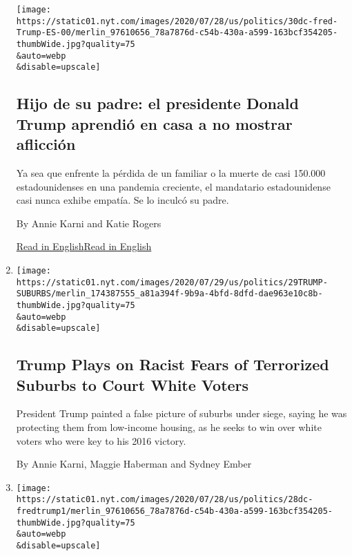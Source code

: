 \begin{enumerate}
  \texttt{[image: https://static01.nyt.com/images/2020/07/28/us/politics/30dc-fred-Trump-ES-00/merlin\_97610656\_78a7876d-c54b-430a-a599-163bcf354205-thumbWide.jpg?quality=75\\\&auto=webp\\\&disable=upscale]}

  \hypertarget{hijo-de-su-padre-el-presidente-donald-trump-aprendiuxf3-en-casa-a-no-mostrar-aflicciuxf3n}{%
  \subsection{Hijo de su padre: el presidente Donald Trump aprendió en
  casa a no mostrar
  aflicción}\label{hijo-de-su-padre-el-presidente-donald-trump-aprendiuxf3-en-casa-a-no-mostrar-aflicciuxf3n}}

  Ya sea que enfrente la pérdida de un familiar o la muerte de casi
  150.000 estadounidenses en una pandemia creciente, el mandatario
  estadounidense casi nunca exhibe empatía. Se lo inculcó su padre.

  By Annie Karni and Katie Rogers

  \href{https://www.nytimes.com/2020/07/28/us/politics/donald-fred-trump.html}{Read
  in
  English}\href{https://www.nytimes.com/2020/07/28/us/politics/donald-fred-trump.html}{Read
  in English}
\item
  \href{/2020/07/29/us/politics/trump-suburbs-housing-white-voters.html}{}

  \texttt{[image: https://static01.nyt.com/images/2020/07/29/us/politics/29TRUMP-SUBURBS/merlin\_174387555\_a81a394f-9b9a-4bfd-8dfd-dae963e10c8b-thumbWide.jpg?quality=75\\\&auto=webp\\\&disable=upscale]}

  \hypertarget{trump-plays-on-racist-fears-of-terrorized-suburbs-to-court-white-voters}{%
  \subsection{Trump Plays on Racist Fears of Terrorized Suburbs to Court
  White
  Voters}\label{trump-plays-on-racist-fears-of-terrorized-suburbs-to-court-white-voters}}

  President Trump painted a false picture of suburbs under siege, saying
  he was protecting them from low-income housing, as he seeks to win
  over white voters who were key to his 2016 victory.

  By Annie Karni, Maggie Haberman and Sydney Ember
\item
  \href{/2020/07/28/us/politics/donald-fred-trump.html}{}

  \texttt{[image: https://static01.nyt.com/images/2020/07/28/us/politics/28dc-fredtrump1/merlin\_97610656\_78a7876d-c54b-430a-a599-163bcf354205-thumbWide.jpg?quality=75\\\&auto=webp\\\&disable=upscale]}


\end{enumerate}
